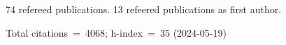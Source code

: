 74 refereed publications. 13 refeered publications as first author.

Total citations~=~4068; h-index~=~35 (2024-05-19)